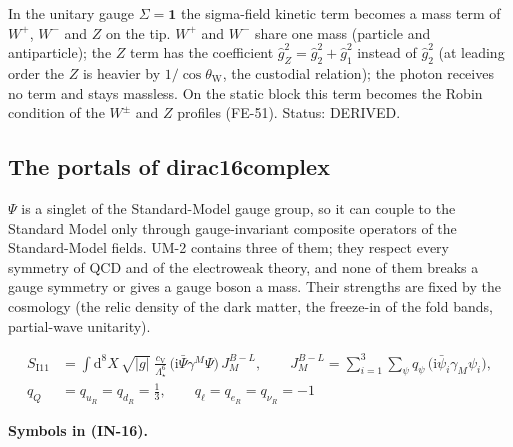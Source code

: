 \documentclass[
  10pt,
]{article}
\begin{document}
In the unitary gauge \(\Sigma = \mathbf{1}\) the sigma-field kinetic
term becomes a mass term of \(W^+\), \(W^-\) and \(Z\) on the tip.
\(W^+\) and \(W^-\) share one mass (particle and antiparticle); the
\(Z\) term has the coefficient \(\hat g_Z^2 = \hat g_2^2 + \hat g_1^2\)
instead of \(\hat g_2^2\) (at leading order the \(Z\) is heavier by
\(1/\cos\theta_{\mathrm{W}}\), the custodial relation); the photon
receives no term and stays massless. On the static block this term
becomes the Robin condition of the \(W^\pm\) and \(Z\) profiles (FE-51).
Status: DERIVED.

\hypertarget{the-portals-of-dirac16complex}{%
\subsection{The portals of
dirac16complex}\label{the-portals-of-dirac16complex}}

\(\Psi\) is a singlet of the Standard-Model gauge group, so it can
couple to the Standard Model only through gauge-invariant composite
operators of the Standard-Model fields. UM-2 contains three of them;
they respect every symmetry of QCD and of the electroweak theory, and
none of them breaks a gauge symmetry or gives a gauge boson a mass.
Their strengths are fixed by the cosmology (the relic density of the
dark matter, the freeze-in of the fold bands, partial-wave unitarity).

\[
\begin{aligned}
S_{\mathrm{I11}} &= \int\mathrm{d}^8X\,\sqrt{\lvert g\rvert}\;\frac{c_{\mathrm{V}}}{\Lambda_\star^6}\,
 \big(\mathrm{i}\bar\Psi\gamma^M\Psi\big)\,J^{B-L}_M,\qquad
 J^{B-L}_M = \sum_{i=1}^{3}\sum_{\psi} q_\psi\,\big(\mathrm{i}\bar\psi_i\gamma_M\psi_i\big),\\
q_Q &= q_{u_R} = q_{d_R} = \frac13,\qquad q_\ell = q_{e_R} = q_{\nu_R} = -1
\end{aligned} \tag{IN-16}
\]

\textbf{Symbols in (IN-16).}
\end{document}
